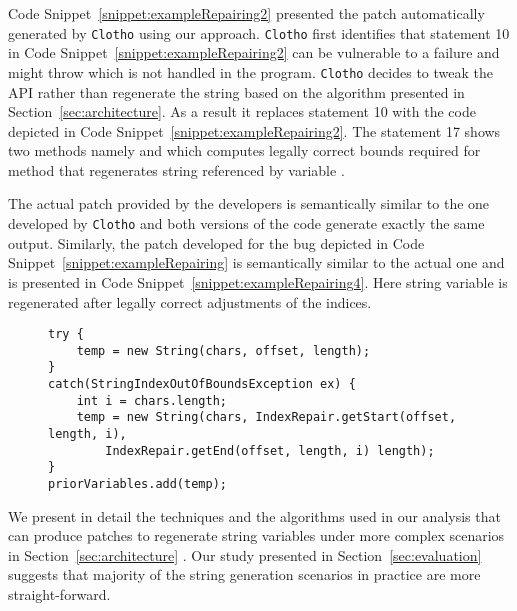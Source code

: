 Code Snippet~\ref{snippet:exampleRepairing2} presented the patch automatically generated by \texttt{Clotho}
using our approach. \texttt{Clotho} first identifies that statement 10 in Code Snippet~\ref{snippet:exampleRepairing2}
can be vulnerable to a failure and might throw  which is not handled in the program.
\texttt{Clotho} decides to tweak the API rather than regenerate the string based on the algorithm presented in
Section~\ref{sec:architecture}. As a result it replaces statement 10 with the code depicted in Code
Snippet~\ref{snippet:exampleRepairing2}. The statement 17 shows two methods namely  and 
which computes legally correct bounds required for  method that regenerates string referenced by variable . 

The actual patch provided by the developers is semantically similar to the one developed by \texttt{Clotho} and both versions
of the code generate exactly the same output. Similarly, the patch developed for the bug depicted in Code Snippet~\ref{snippet:exampleRepairing}
is semantically similar to the actual one and is presented in Code Snippet~\ref{snippet:exampleRepairing4}. Here string 
variable  is regenerated after legally correct adjustments of the indices.

\lstset{language=java, caption=Patch for the Appache Log4j bug,
label = snippet:exampleRepairing4, basicstyle=\scriptsize, firstnumber
=4}
\begin{figure}[t]
\begin{lstlisting}
try {
	temp = new String(chars, offset, length);
}
catch(StringIndexOutOfBoundsException ex) {
	int i = chars.length;
	temp = new String(chars, IndexRepair.getStart(offset, length, i),
		IndexRepair.getEnd(offset, length, i) length); 
}
priorVariables.add(temp);
\end{lstlisting}
\end{figure}

We present in detail the techniques and the algorithms used in our analysis that can produce patches to regenerate string variables under more
complex scenarios in Section~\ref{sec:architecture} . Our study presented in Section~\ref{sec:evaluation} suggests that majority
of the string generation scenarios in practice are more straight-forward.





















